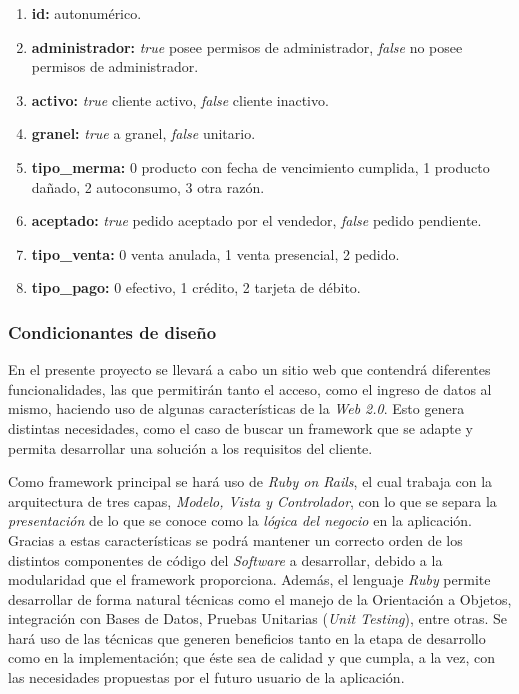 \documentclass[letterpaper,12pt]{article}
\begin{document}
\begin{enumerate}
\item \textbf{id:} 
autonumérico.
\item \textbf{administrador:} 
\emph{true} posee permisos de administrador, \emph{false} no posee permisos de administrador.
\item \textbf{activo:}
\emph{true} cliente activo, \emph{false} cliente inactivo.
\item \textbf{granel:}
\emph{true} a granel, \emph{false} unitario.
\item \textbf{tipo\_merma:}
0 producto con fecha de vencimiento cumplida, 1 producto dañado, 2 autoconsumo, 3 otra razón. 
\item \textbf{aceptado:}
\emph{true} pedido aceptado por el vendedor, \emph{false} pedido pendiente.
\item \textbf{tipo\_venta:}
0 venta anulada, 1 venta presencial, 2 pedido.
\item \textbf{tipo\_pago:}
0 efectivo, 1 crédito, 2 tarjeta de débito.
\end{enumerate}

\newpage

\subsubsection{Condicionantes de diseño}

En el presente proyecto se llevará a cabo un sitio web que contendrá diferentes 
funcionalidades, las que permitirán tanto el acceso, como el ingreso de datos
al mismo, haciendo uso de algunas características de la \emph{Web 2.0}. 
Esto genera distintas necesidades, como el caso de buscar un framework que se adapte 
y permita desarrollar una solución a los requisitos del cliente.

Como framework principal se hará uso de \emph{Ruby on Rails}, el cual trabaja con
la arquitectura de tres capas, \emph{Modelo, Vista y Controlador}, con lo que
se separa la \emph{presentación} de lo que se conoce como la \emph{lógica del negocio} 
en la aplicación. Gracias a estas características se podrá mantener un correcto orden de 
los distintos componentes de código del \emph{Software} a desarrollar, debido a la modularidad 
que el framework proporciona. 
Además, el lenguaje \emph{Ruby} permite desarrollar de forma natural técnicas como el manejo de la 
Orientación a Objetos, integración con Bases de Datos, Pruebas Unitarias 
(\emph{Unit Testing}), entre otras. Se hará uso de las técnicas que 
generen beneficios tanto en la etapa de desarrollo como en la implementación; 
que éste sea de calidad y que cumpla, a la vez, con las necesidades propuestas 
por el futuro usuario de la aplicación.
\end{document}
